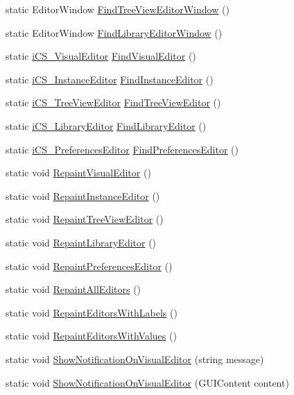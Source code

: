 \begin{DoxyCompactItemize}
\item 
static Editor\+Window \hyperlink{classi_c_s___editor_controller_a649fed560efe6816c9298070fb9bb6f4}{Find\+Tree\+View\+Editor\+Window} ()
\item 
static Editor\+Window \hyperlink{classi_c_s___editor_controller_a39226d1e5fe1a081786d4366f2d0b9b3}{Find\+Library\+Editor\+Window} ()
\item 
static \hyperlink{classi_c_s___visual_editor}{i\+C\+S\+\_\+\+Visual\+Editor} \hyperlink{classi_c_s___editor_controller_ab5725d51b61d55c437abe362cd5de434}{Find\+Visual\+Editor} ()
\item 
static \hyperlink{classi_c_s___instance_editor}{i\+C\+S\+\_\+\+Instance\+Editor} \hyperlink{classi_c_s___editor_controller_a5116433ba362c9b90637c36fac0851d7}{Find\+Instance\+Editor} ()
\item 
static \hyperlink{classi_c_s___tree_view_editor}{i\+C\+S\+\_\+\+Tree\+View\+Editor} \hyperlink{classi_c_s___editor_controller_a02170f2d9a846976c98a1c9b496e812b}{Find\+Tree\+View\+Editor} ()
\item 
static \hyperlink{classi_c_s___library_editor}{i\+C\+S\+\_\+\+Library\+Editor} \hyperlink{classi_c_s___editor_controller_a985737443711843863bf4aa6e2455555}{Find\+Library\+Editor} ()
\item 
static \hyperlink{classi_c_s___preferences_editor}{i\+C\+S\+\_\+\+Preferences\+Editor} \hyperlink{classi_c_s___editor_controller_ae62031bf2a30e82eb5315cf8d892ded1}{Find\+Preferences\+Editor} ()
\item 
static void \hyperlink{classi_c_s___editor_controller_ae5a6d2a9ad3de61d866e3f02d186fdde}{Repaint\+Visual\+Editor} ()
\item 
static void \hyperlink{classi_c_s___editor_controller_ade0f977a16787181af5cbb6cdb302e7d}{Repaint\+Instance\+Editor} ()
\item 
static void \hyperlink{classi_c_s___editor_controller_ae03692b793f6c7925f578d7e673bc9e4}{Repaint\+Tree\+View\+Editor} ()
\item 
static void \hyperlink{classi_c_s___editor_controller_a967863c1e8fc84328548e124a32185d5}{Repaint\+Library\+Editor} ()
\item 
static void \hyperlink{classi_c_s___editor_controller_a69aac6f57638f979416e95f4f4dfed07}{Repaint\+Preferences\+Editor} ()
\item 
static void \hyperlink{classi_c_s___editor_controller_a9512fdc77f60a40eae0e281d173a59a1}{Repaint\+All\+Editors} ()
\item 
static void \hyperlink{classi_c_s___editor_controller_afad07f3e605b33ce16617ab075792d51}{Repaint\+Editors\+With\+Labels} ()
\item 
static void \hyperlink{classi_c_s___editor_controller_a8ced5736fb07351f010a2e4c18be1d75}{Repaint\+Editors\+With\+Values} ()
\item 
static void \hyperlink{classi_c_s___editor_controller_aa20e157d576adcfff9632e1e2be27bcf}{Show\+Notification\+On\+Visual\+Editor} (string message)
\item 
static void \hyperlink{classi_c_s___editor_controller_a3de55c05134be6327c97568a961ab26b}{Show\+Notification\+On\+Visual\+Editor} (G\+U\+I\+Content content)
\end{DoxyCompactItemize}



